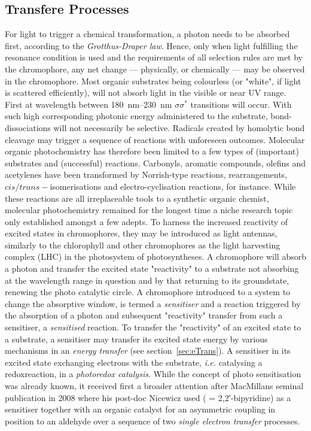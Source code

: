 		\subsection{Transfere Processes}
		For light to trigger a chemical transformation, a photon needs to be absorbed first, according to the \emph{Grotthus-Draper law}. Hence, only when light fulfilling the resonance condition is used and the requirements of all selection rules are met by the chromophore, any net change --- physically, or chemically --- may be observed in the chromophore. Most organic substrates being colourless (or "white", if light is scattered efficiently), will not absorb light in the visible or near UV range. First at wavelength between \qtyrange{180}{230}{\nm} $\sigma\sigma^{\ast}$ transitions  will occur. With such high corresponding photonic energy administered to the substrate, bond-dissociations will not necessarily be selective. Radicals created by homolytic bond cleavage may trigger a sequence of reactions with unforeseen outcomes. Molecular organic photochemistry has therefore been limited to a few types of (important) substrates and (successful) reactions. Carbonyls, aromatic compounds, olefins and acetylenes have been transformed by Norrish-type reactions, rearrangements, $cis/trans-$isomerisations and electro-cyclisation reactions, for instance. While these reactions are all irreplaceable tools to a synthetic organic chemist, molecular photochemistry remained for the longest time a niche research topic only established amongst a few adepts. To harness the increased reactivity of excited states in chromophores, they may be introduced as light antennas, similarly to the chlorophyll and other chromophores as the light harvesting complex (LHC) in the photosystem of photosyntheses. A chromophore will absorb a photon and transfer the excited state "reactivity" to a substrate not absorbing at the wavelength range in question and by that returning to its groundstate, renewing the photo catalytic circle. A chromophore introduced to a system to change the absorptive window, is termed a \emph{sensitiser} and a reaction triggered by the absorption of a photon and subsequent "reactivity" transfer from such a sensitiser, a \emph{sensitised} reaction. To transfer the "reactivity" of an excited state to a substrate, a sensitiser may transfer its excited state energy by various mechanisms in an \emph{energy transfer} (see section~\ref{sec:eTrans}). A sensitiser in its excited state exchanging electrons with the substrate, \textit{i.e.} catalysing a redoxreaction, in a \emph{photoredox catalysis}. While the concept of photo sensitisation was already known, it received first a broader attention after MacMillans seminal publication in 2008 where his post-doc Nicewicz used  ( = 2,2′-bipyridine) as a sensitiser together with an organic catalyst for an asymmetric  coupling in \ce{\alpha} position to an aldehyde over a sequence of two \emph{single electron transfer} processes. %
